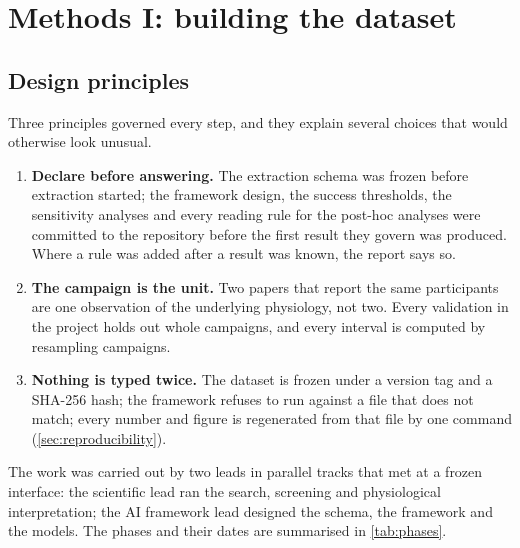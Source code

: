 \section{Methods I: building the dataset}
\label{sec:methods-data}

\subsection{Design principles}

Three principles governed every step, and they explain several choices that would otherwise look unusual.

\begin{enumerate}
  \item \textbf{Declare before answering.} The extraction schema was frozen before extraction started; the
        framework design, the success thresholds, the sensitivity analyses and every reading rule for the
        post-hoc analyses were committed to the repository before the first result they govern was produced. Where
        a rule was added after a result was known, the report says so.
  \item \textbf{The campaign is the unit.} Two papers that report the same participants are one observation of
        the underlying physiology, not two. Every validation in the project holds out whole campaigns, and every
        interval is computed by resampling campaigns.
  \item \textbf{Nothing is typed twice.} The dataset is frozen under a version tag and a SHA-256 hash; the
        framework refuses to run against a file that does not match; every number and figure is regenerated from
        that file by one command (\cref{sec:reproducibility}).
\end{enumerate}

The work was carried out by two leads in parallel tracks that met at a frozen interface: the scientific lead ran
the search, screening and physiological interpretation; the AI framework lead designed the schema, the framework
and the models. The phases and their dates are summarised in \cref{tab:phases}.

